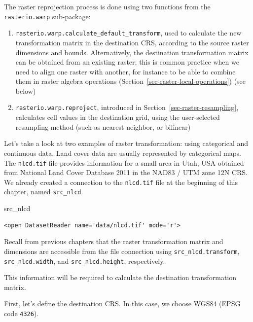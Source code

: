 \documentclass[
  letterpaper,
]{krantz}
\newenvironment{Shaded}{\begin{snugshade}}{\end{snugshade}}
\newcommand{\NormalTok}[1]{\textcolor[rgb]{0.00,0.23,0.31}{#1}}
\providecommand{\tightlist}{%
  \setlength{\itemsep}{0pt}\setlength{\parskip}{0pt}}\usepackage{longtable,booktabs,array}
\begin{document}
The raster reprojection process is done using two functions from the
\texttt{rasterio.warp} sub-package:

\begin{enumerate}
\def\labelenumi{\arabic{enumi}.}
\tightlist
\item
  \texttt{rasterio.warp.calculate\_default\_transform}, used to
  calculate the new transformation matrix in the destination CRS,
  according to the source raster dimensions and bounds. Alternatively,
  the destination transformation matrix can be obtained from an existing
  raster; this is common practice when we need to align one raster with
  another, for instance to be able to combine them in raster algebra
  operations (Section~\ref{sec-raster-local-operations}) (see below)
\item
  \texttt{rasterio.warp.reproject}, introduced in
  Section~\ref{sec-raster-resampling}, calculates cell values in the
  destination grid, using the user-selected resampling method (such as
  nearest neighbor, or bilinear)
\end{enumerate}

Let's take a look at two examples of raster transformation: using
categorical and continuous data. Land cover data are usually represented
by categorical maps. The \texttt{nlcd.tif} file provides information for
a small area in Utah, USA obtained from National Land Cover Database
2011 in the NAD83 / UTM zone 12N CRS. We already created a connection to
the \texttt{nlcd.tif} file at the beginning of this chapter, named
\texttt{src\_nlcd}.

\begin{Shaded}
\begin{Highlighting}[]
\NormalTok{src\_nlcd}
\end{Highlighting}
\end{Shaded}

\begin{verbatim}
<open DatasetReader name='data/nlcd.tif' mode='r'>
\end{verbatim}

Recall from previous chapters that the raster transformation matrix and
dimensions are accessible from the file connection using
\texttt{src\_nlcd.transform}, \texttt{src\_nlcd.width}, and
\texttt{src\_nlcd.height}, respectively.

This information will be required to calculate the destination
transformation matrix.

First, let's define the destination CRS. In this case, we choose WGS84
(EPSG code \texttt{4326}).
\end{document}
